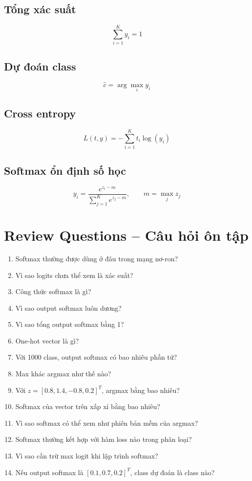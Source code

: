 \subsection*{Tổng xác suất}

\[
    \sum_{i=1}^{K} y_i = 1
\]

\subsection*{Dự đoán class}

\[
    \hat{c}=\arg\max_i y_i
\]

\subsection*{Cross entropy}

\[
    L(t,y)=-\sum_{i=1}^{K}t_i\log(y_i)
\]

\subsection*{Softmax ổn định số học}

\[
    y_i =
    \frac{e^{z_i-m}}
    {\sum_{j=1}^{K}e^{z_j-m}},
    \qquad
    m=\max_j z_j
\]

\section{Review Questions -- Câu hỏi ôn tập}

\begin{enumerate}
    \item Softmax thường được dùng ở đâu trong mạng nơ-ron?
    \item Vì sao logits chưa thể xem là xác suất?
    \item Công thức softmax là gì?
    \item Vì sao output softmax luôn dương?
    \item Vì sao tổng output softmax bằng 1?
    \item One-hot vector là gì?
    \item Với 1000 class, output softmax có bao nhiêu phần tử?
    \item Max khác argmax như thế nào?
    \item Với $z=[0.8,1.4,-0.8,0.2]^T$, argmax bằng bao nhiêu?
    \item Softmax của vector trên xấp xỉ bằng bao nhiêu?
    \item Vì sao softmax có thể xem như phiên bản mềm của argmax?
    \item Softmax thường kết hợp với hàm loss nào trong phân loại?
    \item Vì sao cần trừ max logit khi lập trình softmax?
    \item Nếu output softmax là $[0.1,0.7,0.2]^T$, class dự đoán là class nào?
\end{enumerate}

